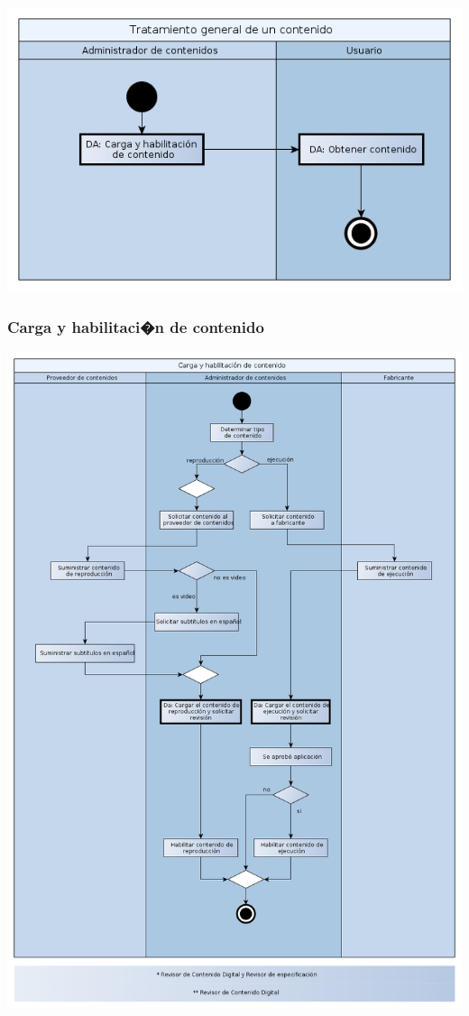 \documentclass[11pt, a4paper, spanish]{article}
\begin{document}
{	\begin{center}
		\includegraphics[scale=0.37]{Diagramas/02-TratamientoGeneralDeUnContenidoDA.png}
	\end{center}

\newpage

\subsubsection{Carga y habilitaci�n de contenido}

	\begin{center}
		\includegraphics[scale=0.37]{Diagramas/03-CargaYHabilitacionDeContenidoDA.png}
	\end{center}
\newpage

}
\end{document}
